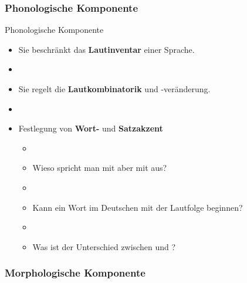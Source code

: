 %
\subsubsection{Phonologische Komponente}
%

\begin{frame}{Phonologische Komponente}

	\begin{itemize}
		\item Sie beschränkt das \textbf{Lautinventar} einer Sprache.
		\item[]
		\item Sie regelt die \textbf{Lautkombinatorik} und -veränderung.
		\item[]
		\item Festlegung von \textbf{Wort-} und \textbf{Satzakzent}

		\begin{itemize}
			\item[]
			\item<2->[$\rightarrow$] Wieso spricht man  mit \textipa{[t]} aber  mit \textipa{[d]} aus?
			\item[]
			\item<3->[$\rightarrow$] Kann ein Wort im Deutschen mit der Lautfolge \textipa{[Ng]} beginnen?
			\item[]
			\item<4->[$\rightarrow$] Was ist der Unterschied zwischen  und ?
		\end{itemize}		  
	
	\end{itemize}
	
\end{frame}


%
\subsubsection{Morphologische Komponente}
%

